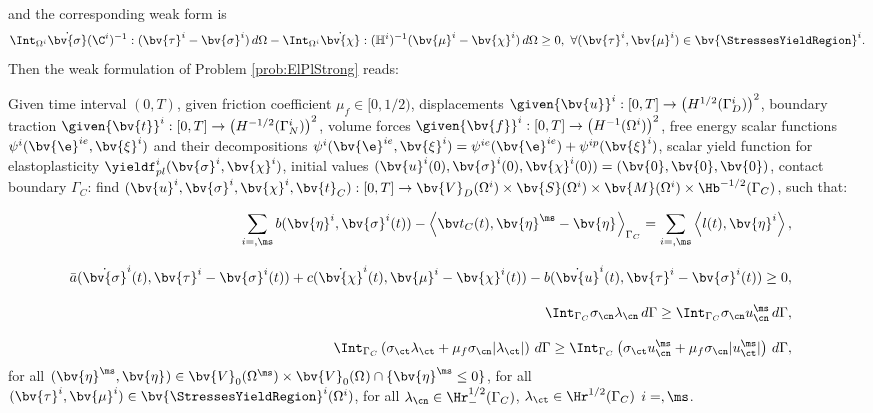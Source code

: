 and the corresponding  weak form  is
\begin{equation}\label{eq:temp:ElPlContWeakFormPlasticity}
\Int_{\Omega^{i}}\dot{\bv{\sigma}}(\C^{i})^{-1}:(\bv{\tau}^{i}-\bv{\sigma}^{i})\,d\Omega-\Int_{\Omega^{i}}\dot{\bv{\chi}}:(\mathbb{H}^{i})^{-1}(\bv{\mu}^{i}-\bv{\chi}^{i})\,d\Omega\geq 0,~\forall (\bv{\tau}^{i},\bv{\mu}^{i})\in \bv{\StressesYieldRegion}^{i}.
\end{equation}
Then the weak formulation of Problem \ref{prob:ElPlStrong} reads:
\begin{problem}\label{prob:ElPlWeak}
Given time interval  $(0,T)$, given  friction coefficient $\mu_f \in [0,1/2) $, displacements $\given{\bv{u}}^i: [0,T] \rightarrow \left(H^{1/2}(\Gamma_D^i)\right)^2$, boundary traction 
$\given{\bv{t}}^i: [0,T] \rightarrow \left(H^{-1/2}(\Gamma_N^i)\right)^2$, volume forces $\given{\bv{f}}^i: [0,T]\rightarrow \left(H^{-1}(\Omega^i)\right)^2$, free energy scalar functions $\psi^i(\bv{\e}^{ie},\bv{\xi}^i)$ and their decompositions $\psi^i(\bv{\e}^{ie},\bv{\xi}^i)=\psi^{ie}(\bv{\e}^{ie})+\psi^{ip}(\bv{\xi}^i)$, scalar yield  function for elastoplasticity $\yieldf_{pl}^i(\bv{\sigma}^i,\bv{\chi}^i)$, initial values $(\bv{u}^i(0),\bv{\sigma}^{i}(0),\bv{\chi}^{i}(0))=(\bv{0},\bv{0},\bv{0})$, contact boundary $\Gamma_C$: find $(\bv{u}^i,\bv{\sigma}^{i},\bv{\chi}^i,\bv{t}_{C}): [0,T] \rightarrow \bv{V}_D(\Omega^i)\times \bv{S}(\Omega^i)\times \bv{M}(\Omega^i)\times \Hb^{-1/2}(\Gamma_C)$, such that:

\begin{eqnarray}
\sum \limits_{i=\sl,\ms}  b(\bv{\eta}^i,\bv{\sigma}^i(t))- \left\langle \bv t_C(t), \bv{\eta}^{\ms}-\bv{\eta}^{\sl} \right\rangle_{\Gamma_C}    =\sum \limits_{i=\sl,\ms} \left\langle l(t),\bv{\eta}^{i}\right\rangle, &&\label{eq:ElPlContWeakFormMech}\\[2ex]
 \bar{a}(\dot{\bv{\sigma}}^i(t),\bv{\tau}^i-\bv{\sigma}^i(t))+c(\dot{\bv{\chi}}^i(t),\bv{\mu}^i-\bv{\chi}^i(t))-b(\dot{\bv{u}}^i(t),\bv{\tau}^i-\bv{\sigma}^i(t))\geq 0, &&\label{eq:ElPlContWeakFormPlast} \\[2ex]
 \Int_{\Gamma_C}\sigma_{\cn}\lambda_{\cn}\, d\Gamma \geq \Int_{\Gamma_C}\sigma_{\cn}u^{\ms\sl}_{\cn}\, d\Gamma, &&\label{eq:ElPlContWeakFormNormalCont} \\[2ex]
 \Int_{\Gamma_C}\left(\sigma_{\ct}\lambda_{\ct}+\mu_f\sigma_{\cn}|\lambda_{\ct}|\right)\, d\Gamma \geq \Int_{\Gamma_C}\left(\sigma_{\ct}u^{\ms\sl}_{\cn}+\mu_f\sigma_{\cn}|u^{\ms\sl}_{\ct}|\right)\, d\Gamma, && \label{eq:ElPlContWeakFormTangentCont} 
\end{eqnarray}
for all $(\bv{\eta}^{\ms},\bv{\eta}^{\sl}) \in \bv{V}_0(\Omega^{\ms})\times \bv{V}_0(\Omega^{\sl}) \cap \{\bv{\eta}^{\ms\sl}\leq 0\} $, for all $(\bv{\tau}^i,\bv{\mu}^i)\in \bv{\StressesYieldRegion}^{i}(\Omega^i)$, for all $\lambda_{\cn}\in \Hr^{1/2}_{-}(\Gamma_{C})$, $\lambda_{\ct}\in \Hr^{1/2}(\Gamma_{C})$ $i=\sl,\ms$. 
\end{problem}
